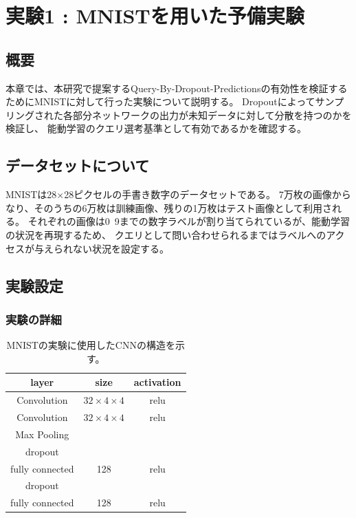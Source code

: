 \chapter{実験1 : MNISTを用いた予備実験}

\section{概要}
本章では、本研究で提案するQuery-By-Dropout-Predictionsの有効性を検証するためにMNISTに対して行った実験について説明する。
Dropoutによってサンプリングされた各部分ネットワークの出力が未知データに対して分散を持つのかを検証し、
能動学習のクエリ選考基準として有効であるかを確認する。

\section{データセットについて}
MNISTは28×28ピクセルの手書き数字のデータセットである。
7万枚の画像からなり、そのうちの6万枚は訓練画像、残りの1万枚はテスト画像として利用される。
それぞれの画像は0~9までの数字ラベルが割り当てられているが、能動学習の状況を再現するため、
クエリとして問い合わせられるまではラベルへのアクセスが与えられない状況を設定する。

\section{実験設定}
\subsection{実験の詳細}

\begin{table}[h]
    \label{table:mnist_cnn}
    \caption{MNISTの実験に使用したCNNの構造を示す。}
    \center
    \begin{tabular}{|c|c|c|} \hline
        layer & size & activation \\ \hline
        Convolution & $32 \times 4 \times 4$ & relu \\
        Convolution & $32 \times 4 \times 4$ & relu \\
        Max Pooling & & \\
        dropout & & \\
        fully connected & 128 & relu \\
        dropout & & \\
        fully connected & 128 & relu \\
        \hline
    \end{tabular}
  \end{table}

